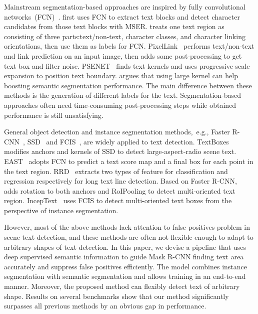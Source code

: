 \documentclass[letterpaper]{article} \usepackage{aaai19}  \usepackage{times}  \usepackage{helvet}  \usepackage{courier}  \usepackage{url}  \usepackage{graphicx}
\begin{document}
Mainstream segmentation-based approaches are inspired by fully convolutional networks~(FCN)~\cite{Long_2015_CVPR}. 
\cite{zhang2016multi} first uses FCN to extract text blocks and detect character candidates from those text blocks with MSER.
\cite{yao2016scene} treats one text region as consisting of three parts:text/non-text, character classes, and character linking orientations, then use them as labels for FCN. 
PixelLink~\cite{deng2018pixellink} performs text/non-text and link prediction on an input image, then adds some post-processing to get text box and filter noise.
PSENET~\cite{li2018shape} finds text kernels and uses progressive scale expansion to position text boundary.
\cite{peng2017large} argues that using large kernel can help boosting semantic segmentation performance.
The main difference between these methods is the generation of different labels for the text. 
Segmentation-based approaches often need time-consuming post-processing steps while obtained performance is still unsatisfying.


General object detection and instance segmentation methods,~e.g., Faster R-CNN~\cite{ren2015faster}, SSD~\cite{liu2016ssd} and FCIS~\cite{li2016fully}, are widely applied to text detection. 
TextBoxes~\cite{liao2017textboxes} modifies anchors and kernels of SSD to detect large-aspect-radio scene text. 
EAST~\cite{zhou2017east} adopts FCN to predict a text score map and a final box for each point in the text region.
RRD~\cite{liao2018rotation} extracts two types of feature for classification and regression respectively for long text line detection.
Based on Faster R-CNN,~\cite{ma2018arbitrary} adds rotation to both anchors and RoIPooling to detect multi-oriented text region.
IncepText~\cite{yang2018inceptext}  uses FCIS to detect multi-oriented text boxes from the perspective of instance segmentation.

However, most of the above methods lack attention to false positives problem in scene text detection, and these methods are often not flexible enough to adapt to arbitrary shapes of text detection. 
In this paper, we devise a pipeline that uses deep supervised semantic information to guide Mask R-CNN finding text area accurately and suppress false positives efficiently.
The model combines instance segmentation with semantic segmentation and allows training in an end-to-end manner.
Moreover, the proposed method can flexibly detect text of arbitrary shape.
Results on several benchmarks show that our method significantly surpasses all previous methods by an obvious gap in performance.
\end{document}
